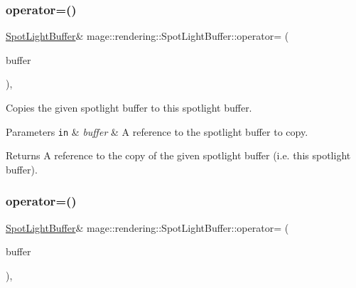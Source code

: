 \subsubsection{\texorpdfstring{operator=()}{operator=()}\hspace{0.1cm}{\footnotesize\ttfamily [1/2]}}
{\footnotesize\ttfamily \mbox{\hyperlink{structmage_1_1rendering_1_1_spot_light_buffer}{Spot\+Light\+Buffer}}\& mage\+::rendering\+::\+Spot\+Light\+Buffer\+::operator= (\begin{DoxyParamCaption}\item[{const \mbox{\hyperlink{structmage_1_1rendering_1_1_spot_light_buffer}{Spot\+Light\+Buffer}} \&}]{buffer }\end{DoxyParamCaption})\hspace{0.3cm}{\ttfamily [default]}, {\ttfamily [noexcept]}}

Copies the given spotlight buffer to this spotlight buffer.


\begin{DoxyParams}[1]{Parameters}
\mbox{\tt in}  & {\em buffer} & A reference to the spotlight buffer to copy. \\
\hline
\end{DoxyParams}
\begin{DoxyReturn}{Returns}
A reference to the copy of the given spotlight buffer (i.\+e. this spotlight buffer). 
\end{DoxyReturn}
\mbox{\label{structmage_1_1rendering_1_1_spot_light_buffer_ab3d50a0d08d284577b0e43b05c34e287}} 
\subsubsection{\texorpdfstring{operator=()}{operator=()}\hspace{0.1cm}{\footnotesize\ttfamily [2/2]}}
{\footnotesize\ttfamily \mbox{\hyperlink{structmage_1_1rendering_1_1_spot_light_buffer}{Spot\+Light\+Buffer}}\& mage\+::rendering\+::\+Spot\+Light\+Buffer\+::operator= (\begin{DoxyParamCaption}\item[{\mbox{\hyperlink{structmage_1_1rendering_1_1_spot_light_buffer}{Spot\+Light\+Buffer}} \&\&}]{buffer }\end{DoxyParamCaption})\hspace{0.3cm}{\ttfamily [default]}, {\ttfamily [noexcept]}}

